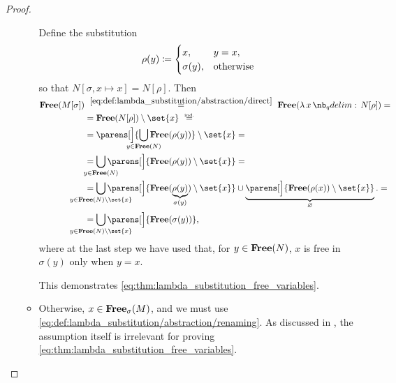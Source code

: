 \begin{proof}
\begin{itemize}
\begin{itemize}
      Define the substitution
      \begin{equation*}
        \rho(y) \coloneqq \begin{cases}
          x,         &y = x, \\
          \sigma(y), &\T{otherwise}
        \end{cases}
      \end{equation*}
      so that \( N[\sigma, x \mapsto x] = N[\rho] \). Then
      \begin{align*}
        \op*{Free}(M[\sigma])
        &\reloset{\eqref{eq:def:lambda_substitution/abstraction/direct}} =
        \op*{Free}(\qabs x N[\rho])
        = \\ &=
        \op*{Free}(N[\rho]) \setminus \set{ x }
        \reloset{\T{ind.}} = \\ &=
        \parens[\Big]{ \bigcup_{\mathclap{y \in \op*{Free}(N)}} \op*{Free}(\rho(y)) } \setminus \set{ x }
        = \\ &=
        \bigcup_{\mathclap{y \in \op*{Free}(N)}} \parens[\Big]{ \op*{Free}(\rho(y)) \setminus \set{ x } }
        = \\ &=
        \bigcup_{\mathclap{y \in \op*{Free}(N) \setminus \set{ x }}} \parens[\Big]{ \op*{Free}(\underbrace{\rho(y)}_{\sigma(y)}) \setminus \set{ x } } \cup \underbrace{\parens[\Big]{ \op*{Free}(\rho(x)) \setminus \set{ x } }}_\varnothing.
        = \\ &=
        \bigcup_{\mathclap{y \in \op*{Free}(N) \setminus \set{ x }}} \parens[\Big]{ \op*{Free}(\sigma(y)) },
      \end{align*}
      where at the last step we have used that, for \( y \in \op*{Free}(N) \), \( x \) is free in \( \sigma(y) \) only when \( y = x \).

      This demonstrates \eqref{eq:thm:lambda_substitution_free_variables}.

      \item Otherwise, \( x \in \op*{Free}_\sigma(M) \), and we must use \eqref{eq:def:lambda_substitution/abstraction/renaming}. As discussed in , the assumption itself is irrelevant for proving \eqref{eq:thm:lambda_substitution_free_variables}.


\end{itemize}
\end{itemize}
\end{proof}
